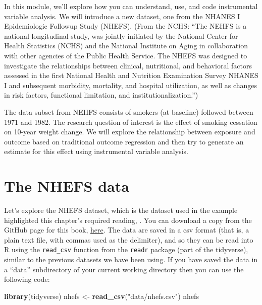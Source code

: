 \documentclass[
]{book}
\newenvironment{Shaded}{\begin{snugshade}}{\end{snugshade}}
\newcommand{\FunctionTok}[1]{\textcolor[rgb]{0.13,0.29,0.53}{\textbf{#1}}}
\newcommand{\NormalTok}[1]{#1}
\newcommand{\OtherTok}[1]{\textcolor[rgb]{0.56,0.35,0.01}{#1}}
\newcommand{\StringTok}[1]{\textcolor[rgb]{0.31,0.60,0.02}{#1}}
\begin{document}
In this module, we'll explore how you can understand, use, and code instrumental
variable analysis. We will introduce a new dataset, one from the NHANES I Epidemiologic Followup Study (NHEFS). (From the NCHS: ``The NEHFS is a national longitudinal study, was jointly initiated by the National Center for Health Statistics (NCHS) and the National Institute on Aging in collaboration with other agencies of the Public Health Service. The NHEFS was designed to investigate the relationships between clinical, nutritional, and behavioral factors assessed in the first National Health and Nutrition Examination Survey NHANES I and subsequent morbidity, mortality, and hospital utilization, as well as changes in risk factors, functional limitation, and institutionalization.'')

The data subset from NEHFS consists of smokers (at baseline) followed between 1971 and 1982. The research question of interest is the effect of smoking cessation on 10-year weight change. We will explore the relationship between exposure and outcome based on traditional outcome regression and then try to generate an estimate for this effect using instrumental variable analysis.

\section{The NHEFS data}\label{the-nhefs-data}

Let's explore the NHEFS dataset, which is the dataset used in the example highlighted
this chapter's required reading, \citet{hernanch16}. You can download a copy from the GitHub page for this book, \href{https://github.com/geanders/adv_epi_analysis/blob/master/data/nhefs.csv}{here}. The data are saved in a csv format (that is, a plain text file, with commas used as the delimiter), and so they can be read into R using the \texttt{read\_csv} function from the \texttt{readr} package (part of the tidyverse), similar to the previous datasets we have been using. If you have saved the data in a ``data'' subdirectory of your current working directory then you can use the following code:

\begin{Shaded}
\begin{Highlighting}[]
\FunctionTok{library}\NormalTok{(tidyverse)}
\NormalTok{nhefs }\OtherTok{\textless{}{-}} \FunctionTok{read\_csv}\NormalTok{(}\StringTok{"data/nhefs.csv"}\NormalTok{)}
\NormalTok{nhefs}
\end{Highlighting}
\end{Shaded}
\end{document}

